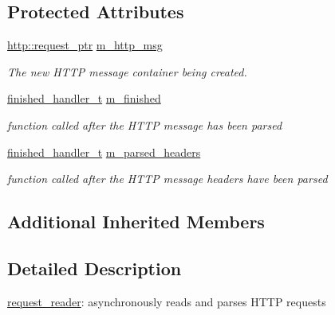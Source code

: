 \subsection*{Protected Attributes}
\begin{DoxyCompactItemize}
\item 
\hyperlink{namespacepion_1_1http_ace432b70a9459d50ff4969a7a47f0ccb}{http\-::request\-\_\-ptr} \hyperlink{classpion_1_1http_1_1request__reader_a670ecf2327f01509109043f182a04ab7}{m\-\_\-http\-\_\-msg}
\begin{DoxyCompactList}\small\item\em The new H\-T\-T\-P message container being created. \end{DoxyCompactList}\item 
\hyperlink{classpion_1_1http_1_1request__reader_a4cc323f3e852134f2ac785e51e1d623e}{finished\-\_\-handler\-\_\-t} \hyperlink{classpion_1_1http_1_1request__reader_a035b12eef619e4223c141686c55d2686}{m\-\_\-finished}
\begin{DoxyCompactList}\small\item\em function called after the H\-T\-T\-P message has been parsed \end{DoxyCompactList}\item 
\hyperlink{classpion_1_1http_1_1request__reader_a4cc323f3e852134f2ac785e51e1d623e}{finished\-\_\-handler\-\_\-t} \hyperlink{classpion_1_1http_1_1request__reader_ac57f7fe823e1a5c560907fa192b56fd5}{m\-\_\-parsed\-\_\-headers}
\begin{DoxyCompactList}\small\item\em function called after the H\-T\-T\-P message headers have been parsed \end{DoxyCompactList}\end{DoxyCompactItemize}
\subsection*{Additional Inherited Members}


\subsection{Detailed Description}
\hyperlink{classpion_1_1http_1_1request__reader}{request\-\_\-reader}\-: asynchronously reads and parses H\-T\-T\-P requests 

